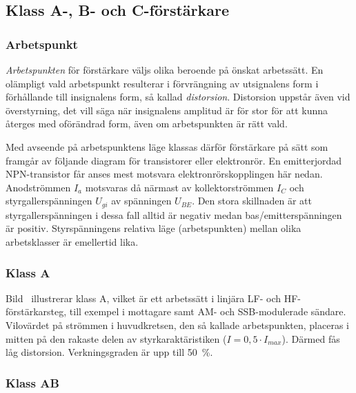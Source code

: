 \subsection{Klass A-, B- och C-förstärkare}
\label{klassabc}

\subsubsection{Arbetspunkt}

\emph{Arbetspunkten} för förstärkare väljs olika beroende på önskat arbetssätt.
En olämpligt vald arbetspunkt resulterar i förvrängning av utsignalens form i
förhållande till insignalens form, så kallad \emph{distorsion}.
Distorsion uppstår även vid överstyrning, det vill säga när insignalens
amplitud är för stor för att kunna återges med oförändrad form, även om
arbetspunkten är rätt vald.

Med avseende på arbetspunktens läge klassas därför förstärkare på sätt
som framgår av följande diagram för transistorer eller elektronrör.
En emitterjordad NPN-transistor får anses mest motsvara
elektronrörskopplingen här nedan.
Anodströmmen \(I_a\) motsvaras då närmast av kollektorströmmen
\(I_C\) och styrgallerspänningen \(U_{gi}\) av spänningen
\(U_{BE}\).
Den stora skillnaden är att styrgallerspänningen i dessa
fall alltid är negativ medan bas/emitterspänningen är positiv.
Styrspänningens relativa läge (arbetspunkten) mellan olika
arbetsklasser är emellertid lika.


\subsubsection{Klass A}

Bild~ illustrerar klass A, vilket är ett arbetssätt i linjära
LF- och HF-förstärkarsteg, till exempel i mottagare samt AM- och SSB-modulerade
sändare.
Vilovärdet på strömmen i huvudkretsen, den så kallade arbetspunkten, placeras i
mitten på den rakaste delen av styrkaraktäristiken (\(I=0,5\cdot I_{max}\)).
Därmed fås låg distorsion.
Verkningsgraden är upp till 50~\%.

\subsubsection{Klass AB}

